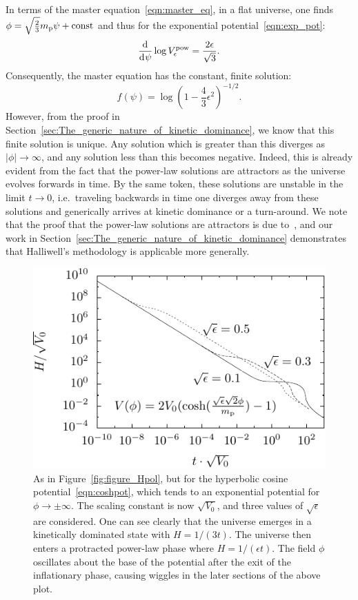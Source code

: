 In terms of the master equation~\eqref{eqn:master_eq}, in a flat universe, one finds \(\phi = \sqrt{\frac{2}{3}}m_{\mathrm{p}} \psi + \mathrm{const} \) and thus for the exponential potential~\eqref{eqn:exp_pot}:
%
\begin{equation}
  \frac{\operatorname{d}^{}\!{}}{\operatorname{d}^{}\!{\psi}} \log V^\mathrm{pow}_\epsilon = \frac{2\epsilon}{\sqrt{3}}. 
\end{equation}
%
Consequently, the master equation has the constant, finite solution:
%
\begin{equation}
  f(\psi) = \log{\left(1-\frac{4}{3}\epsilon^2\right)}^{-1/2}.
  \label{eqn:uf_power_law}
\end{equation}
%
However, from the proof in Section~\ref{sec:The_generic_nature_of_kinetic_dominance}, we know that this finite solution is unique. Any solution which is greater than this diverges as \(|\phi|\to\infty\), and any solution less than this becomes negative.  Indeed, this is already evident from the fact that the power-law solutions are attractors as the universe evolves forwards in time. By the same token, these solutions are unstable in the limit \(t \to 0\), i.e.\ traveling backwards in time one diverges away from these solutions and generically arrives at kinetic dominance or a turn-around.  We note that the proof that the power-law solutions are attractors is due to~\cite{halliwell_scalar_1987}, and our work in Section~\ref{sec:The_generic_nature_of_kinetic_dominance} demonstrates that Halliwell's methodology is applicable more generally.

%
\begin{figure}[tp]
  \includegraphics[width=\textwidth]{chapters/kinetic_dominance/figures/Hlam}
  \caption{As in Figure~\protect\ref{fig:figure_Hpol}, but for the hyperbolic cosine potential~\protect\eqref{eqn:coshpot}, which tends to an exponential potential for \(\phi \to \pm\infty\). The scaling constant is now \(\sqrt{V_0}\), and three values of \(\sqrt{\epsilon}\) are considered. One can see clearly that the universe emerges in a kinetically dominated state with \(H=1/(3t)\). The universe then enters a protracted power-law phase where \(H = 1/(\epsilon t)\). The field \(\phi\) oscillates about the base of the potential after the exit of the inflationary phase, causing wiggles in the later sections of the above plot.}\label{fig:figure_Hlam}
\end{figure}
%

